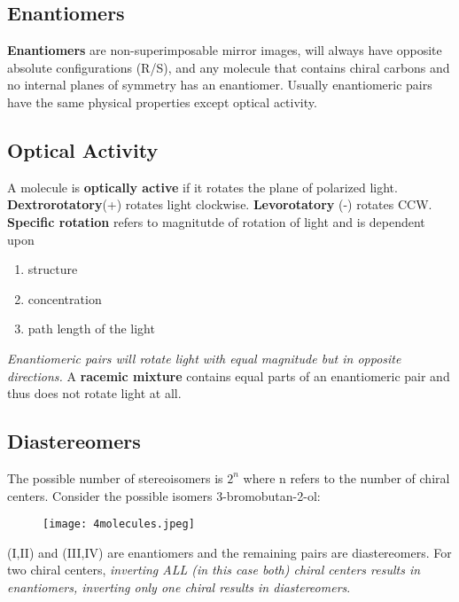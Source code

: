 \documentclass[../OChemReview.tex]{subfiles}
\begin{document}
  \subsection{Enantiomers\supddag}

  \textbf{Enantiomers} are non-superimposable mirror images, will always have
  opposite absolute configurations (R/S), and any molecule that contains chiral
  carbons and no internal planes of symmetry has an enantiomer. Usually
  enantiomeric pairs have the same physical properties except optical activity. 

  \subsection{Optical Activity}

  A molecule is \textbf{optically active} if it rotates the plane of polarized
  light. \textbf{Dextrorotatory}(+) rotates light clockwise.
  \textbf{Levorotatory} (-) rotates CCW. \textbf{Specific rotation} refers to
  magnitutde of rotation of light and is dependent upon
  \begin{enumerate}
    \item structure
    \item concentration
    \item path length of the light
  \end{enumerate}

  \emph{Enantiomeric pairs will rotate light with equal magnitude but in
  opposite directions.} A \textbf{racemic mixture} contains equal parts of an
  enantiomeric pair and thus does not rotate light at all.

  \subsection{Diastereomers}

  The possible number of stereoisomers is $ 2^{n} $ where n refers to the number
  of chiral centers. Consider the possible isomers 3-bromobutan-2-ol:

  \begin{figure}[h]
    \centering
    \texttt{[image: 4molecules.jpeg]}
  \end{figure}

  (I,II) and (III,IV) are enantiomers and the remaining pairs are
  diastereomers. For two chiral centers, \emph{inverting ALL (in this case
  both) chiral centers results in enantiomers, inverting only one chiral results
in diastereomers}.
\end{document}
